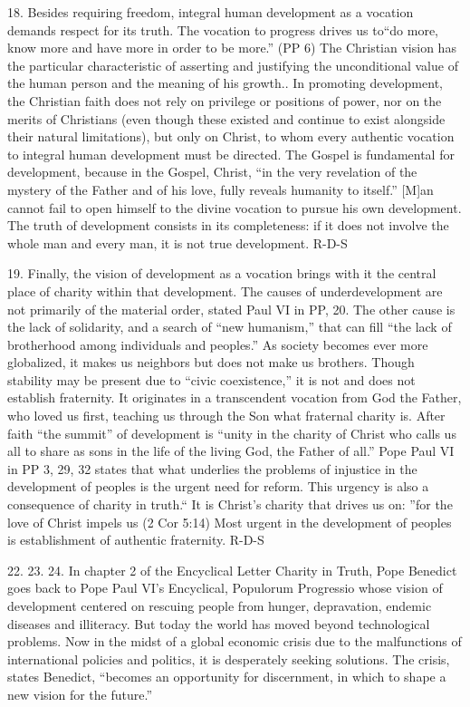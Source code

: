 \documentclass[oneside]{book}
\begin{document}
18. Besides requiring freedom, integral human development as a vocation demands
respect for its truth. The vocation to progress drives us to``do more, know more
and have more in order to be more.'' (PP 6) The Christian vision has the
particular characteristic of asserting and justifying the unconditional value of
the human person and the meaning of his growth.. In promoting development, the
Christian faith does not rely on privilege or positions of power, nor on the
merits of Christians (even though these existed and continue to exist alongside
their natural limitations), but only on Christ, to whom every authentic vocation
to integral human development must be directed. The Gospel is fundamental for
development, because in the Gospel, Christ, ``in the very revelation of the
mystery of the Father and of his love, fully reveals humanity to itself.'' [M]an
cannot fail to open himself to the divine vocation to pursue his own
development. The truth of development consists in its completeness: if it does
not involve the whole man and every man, it is not true development.
R-D-S

19. Finally, the vision of development as a vocation brings with it the central
place of charity within that development. The causes of underdevelopment are not
primarily of the material order, stated Paul VI in PP, 20. The other cause is
the lack of solidarity, and a search of ``new humanism,'' that can fill ``the
lack of brotherhood among individuals and peoples.'' As society becomes ever
more globalized, it makes us neighbors but does not make us brothers. Though
stability may be present due to ``civic coexistence,'' it is not and does not
establish fraternity. It originates in a transcendent vocation from God the
Father, who loved us first, teaching us through the Son what fraternal charity
is. After faith ``the summit'' of development is ``unity in the charity of
Christ who calls us all to share as sons in the life of the living God, the
Father of all.'' Pope Paul VI in PP 3, 29, 32 states that what underlies the
problems of injustice in the development of peoples is the urgent need for
reform. This urgency is also a consequence of charity in truth.`` It is Christ's
charity that drives us on: ''for the love of Christ impels us (2 Cor 5:14) Most
urgent in the development of peoples is establishment of authentic fraternity.
R-D-S

22. 23. 24. In chapter 2 of the Encyclical Letter Charity in Truth, Pope
Benedict goes back to Pope Paul VI's Encyclical, Populorum Progressio whose
vision of development centered on rescuing people from hunger, depravation,
endemic diseases and illiteracy. But today the world has moved beyond
technological problems. Now in the midst of a global economic crisis due to the
malfunctions of international policies and politics, it is desperately seeking
solutions. The crisis, states Benedict, ``becomes an opportunity for
discernment, in which to shape a new vision for the future.''
\end{document}
